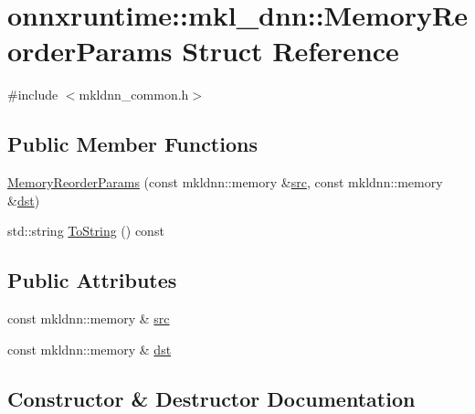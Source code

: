 \hypertarget{structonnxruntime_1_1mkl__dnn_1_1MemoryReorderParams}{}\section{onnxruntime\+:\+:mkl\+\_\+dnn\+:\+:Memory\+Reorder\+Params Struct Reference}
\label{structonnxruntime_1_1mkl__dnn_1_1MemoryReorderParams}


{\ttfamily \#include $<$mkldnn\+\_\+common.\+h$>$}

\subsection*{Public Member Functions}
\begin{DoxyCompactItemize}
\item 
\mbox{\hyperlink{structonnxruntime_1_1mkl__dnn_1_1MemoryReorderParams_a542e9972c4885cbfc5bd874bd0cbf09d}{Memory\+Reorder\+Params}} (const mkldnn\+::memory \&\mbox{\hyperlink{structonnxruntime_1_1mkl__dnn_1_1MemoryReorderParams_a7d431aa4291f0b9d112127290035a41a}{src}}, const mkldnn\+::memory \&\mbox{\hyperlink{structonnxruntime_1_1mkl__dnn_1_1MemoryReorderParams_a866c8e2da6caab689ec70df804157fbe}{dst}})
\item 
std\+::string \mbox{\hyperlink{structonnxruntime_1_1mkl__dnn_1_1MemoryReorderParams_ac71a30289de2af0b7fa57730f8735536}{To\+String}} () const
\end{DoxyCompactItemize}
\subsection*{Public Attributes}
\begin{DoxyCompactItemize}
\item 
const mkldnn\+::memory \& \mbox{\hyperlink{structonnxruntime_1_1mkl__dnn_1_1MemoryReorderParams_a7d431aa4291f0b9d112127290035a41a}{src}}
\item 
const mkldnn\+::memory \& \mbox{\hyperlink{structonnxruntime_1_1mkl__dnn_1_1MemoryReorderParams_a866c8e2da6caab689ec70df804157fbe}{dst}}
\end{DoxyCompactItemize}


\subsection{Constructor \& Destructor Documentation}
\mbox{\label{structonnxruntime_1_1mkl__dnn_1_1MemoryReorderParams_a542e9972c4885cbfc5bd874bd0cbf09d}} 
